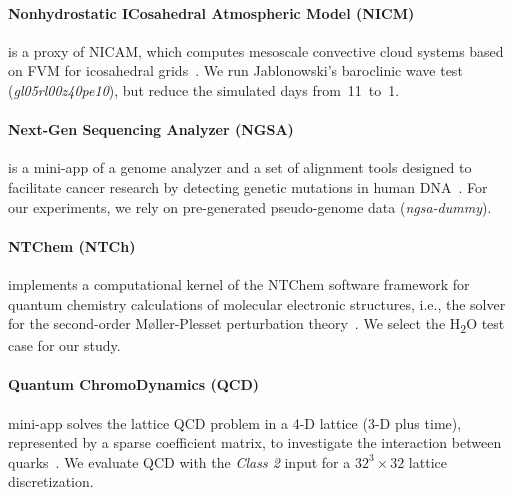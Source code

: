 \paragraph{Nonhydrostatic ICosahedral Atmospheric Model (NICM)} is a proxy of NICAM, which
computes mesoscale convective cloud systems based on FVM for icosahedral grids~\cite{tomita_new_2004}.
We run Jablonowski's baroclinic wave test (\textit{gl05rl00z40pe10}), but reduce the
simulated days from~11~to~1.

\paragraph{Next-Gen Sequencing Analyzer (NGSA)} is a mini-app of a genome analyzer and a set of
alignment tools designed to facilitate cancer research by detecting genetic mutations in
human DNA~\cite{riken_csrp_grand_2013}.
For our experiments, we rely on pre-generated pseudo-genome data (\textit{ngsa-dummy}).

\paragraph{NTChem (NTCh)} implements a computational kernel of the NTChem software framework
for quantum chemistry calculations of molecular electronic structures, i.e., the solver for the
second-order M{\o}ller-Plesset perturbation theory~\cite{nakajima_ntchem:_2014}. We select the
H\textsubscript{2}O test case for our study.

\paragraph{Quantum ChromoDynamics (QCD)} mini-app solves the lattice QCD problem in a 4-D
lattice (3-D plus time), represented by a sparse coefficient matrix, to investigate the
interaction between quarks~\cite{boku_multi-block/multi-core_2012}. We evaluate QCD with the \textit{Class 2}
input for a $32^3 \times 32$ lattice discretization.

